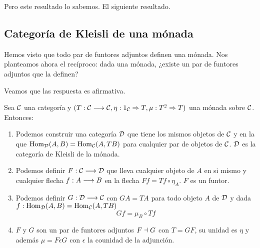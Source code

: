 Pero este resultado lo sabemos. El siguiente resultado.

\subsection{Categoría de Kleisli de una mónada}
Hemos visto que todo par de funtores adjuntos definen una mónada.
Nos planteamos ahora el recíproco: dada una mónada, ¿existe un par
de funtores adjuntos que la definen?

Veamos que las respuesta es afirmativa.

\begin{theorem}
Sea $\mathcal{C}$ una categoría y $(T: \mathcal{C}\longrightarrow \mathcal{C}, \eta: 1_{\mathcal{C}}\Rightarrow T, \mu: T^2\Rightarrow T)$
una mónada sobre $\mathcal{C}$. Entonces:

\begin{enumerate}
\item Podemos construir una categoría $\mathcal{D}$ que tiene los mismos objetos
  de $\mathcal{C}$ y en la que $\operatorname{Hom}_{\mathcal{D}}(A, B) = \operatorname{Hom}_{\mathcal{C}}(A, TB)$ para cualquier
  par de objetos de $\mathcal{C}$. $\mathcal{D}$ es la categoría de Kleisli de la mónada.


\item Podemos definir $F: \mathcal{C}\longrightarrow \mathcal{D}$ que lleva cualquier objeto
  de $A$ en si mismo y cualquier flecha $f : A\longrightarrow B$ en la flecha
  $Ff = Tf \circ \eta_A$. $F$ es un funtor.

\item Podemos definir $G: \mathcal{D}\longrightarrow \mathcal{C}$ con $GA = TA$ para todo objeto
  $A$ de $\mathcal{D}$ y dada $f: \operatorname{Hom}_{\mathcal{D}}(A, B) = \operatorname{Hom}_{\mathcal{C}}(A, TB)$
  $$Gf =  \mu_B \circ Tf$$

\item $F$ y $G$ son un par de funtores adjuntos $F \dashv G$
  con $T = GF$, su
  unidad es $\eta$ y además $\mu = F\epsilon G$ con $\epsilon$
  la counidad de la adjunción.
\end{enumerate}
\end{theorem}
